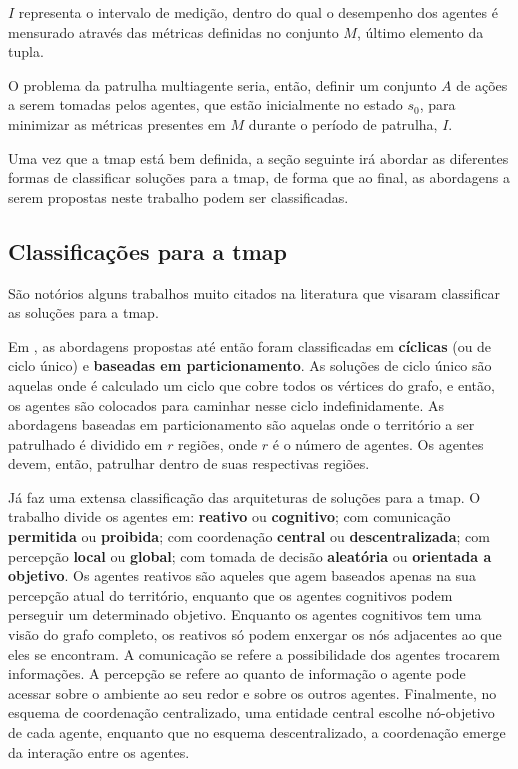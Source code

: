 $I$ representa o intervalo de medição, dentro do qual o desempenho dos agentes 
é mensurado através das métricas definidas no conjunto $M$, último elemento da 
tupla.

O problema da patrulha multiagente seria, então, definir um conjunto $A$ de 
ações a serem tomadas pelos agentes, que estão inicialmente no estado $s_{0}$, 
para minimizar as métricas presentes em $M$ durante o período de patrulha, $I$.

Uma vez que a \ac{tmap} está bem definida, a seção seguinte irá abordar as 
diferentes formas de classificar soluções para a \ac{tmap}, de forma que ao 
final, as abordagens a serem propostas neste trabalho podem ser classificadas.

\subsection{Classificações para a \ac{tmap}}
\label{sec:classifytmap}

São notórios alguns trabalhos muito citados na literatura que visaram 
classificar as soluções para a \ac{tmap}.

Em \citep{Chevaleyre:2004:TAM:1018411.1019013}, as abordagens propostas até 
então foram classificadas em \textbf{cíclicas} (ou de ciclo único) e \textbf{
baseadas em particionamento}. As soluções de ciclo único são aquelas onde é 
calculado um ciclo que cobre todos os vértices do grafo, e então, os agentes são 
colocados para caminhar nesse ciclo indefinidamente. As abordagens baseadas em 
particionamento são aquelas onde o território a ser patrulhado é dividido em 
$r$ regiões, onde $r$ é o número de agentes. Os agentes devem, então, patrulhar 
dentro de suas respectivas regiões.

Já \citep{Machado:2002:MPE:1765317.1765332} faz uma extensa classificação das 
arquiteturas de soluções para a \ac{tmap}. O trabalho divide os agentes em: \textbf{
reativo} ou \textbf{cognitivo}; com comunicação \textbf{permitida} ou \textbf{
proibida}; com coordenação \textbf{central} ou \textbf{descentralizada}; com 
percepção \textbf{local} ou \textbf{global}; com tomada de decisão \textbf{
aleatória} ou \textbf{orientada a objetivo}. Os agentes reativos são aqueles que 
agem baseados apenas na sua percepção atual do território, enquanto que os 
agentes cognitivos podem perseguir um determinado objetivo. Enquanto os agentes 
cognitivos tem uma visão do grafo completo, os reativos só podem enxergar os nós 
adjacentes ao que eles se encontram. A comunicação se refere a possibilidade dos 
agentes trocarem informações. A percepção se refere ao quanto de informação o 
agente pode acessar sobre o ambiente ao seu redor e sobre os outros agentes. 
Finalmente, no esquema de coordenação centralizado, uma entidade central escolhe 
nó-objetivo de cada agente, enquanto que no esquema descentralizado, a 
coordenação emerge da interação entre os agentes.

